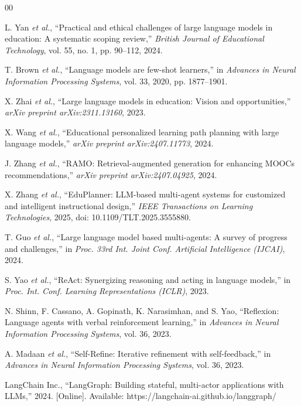 \begin{thebibliography}{00}

 L. Yan \emph{et al.}, ``Practical and ethical challenges of large language models in education: A systematic scoping review,'' \emph{British Journal of Educational Technology}, vol. 55, no. 1, pp. 90--112, 2024.

 T. Brown \emph{et al.}, ``Language models are few-shot learners,'' in \emph{Advances in Neural Information Processing Systems}, vol. 33, 2020, pp. 1877--1901.

 X. Zhai \emph{et al.}, ``Large language models in education: Vision and opportunities,'' \emph{arXiv preprint arXiv:2311.13160}, 2023.

 X. Wang \emph{et al.}, ``Educational personalized learning path planning with large language models,'' \emph{arXiv preprint arXiv:2407.11773}, 2024.

 J. Zhang \emph{et al.}, ``RAMO: Retrieval-augmented generation for enhancing MOOCs recommendations,'' \emph{arXiv preprint arXiv:2407.04925}, 2024.

 X. Zhang \emph{et al.}, ``EduPlanner: LLM-based multi-agent systems for customized and intelligent instructional design,'' \emph{IEEE Transactions on Learning Technologies}, 2025, doi: 10.1109/TLT.2025.3555880.

 T. Guo \emph{et al.}, ``Large language model based multi-agents: A survey of progress and challenges,'' in \emph{Proc. 33rd Int. Joint Conf. Artificial Intelligence (IJCAI)}, 2024.

 S. Yao \emph{et al.}, ``ReAct: Synergizing reasoning and acting in language models,'' in \emph{Proc. Int. Conf. Learning Representations (ICLR)}, 2023.

 N. Shinn, F. Cassano, A. Gopinath, K. Narasimhan, and S. Yao, ``Reflexion: Language agents with verbal reinforcement learning,'' in \emph{Advances in Neural Information Processing Systems}, vol. 36, 2023.

 A. Madaan \emph{et al.}, ``Self-Refine: Iterative refinement with self-feedback,'' in \emph{Advances in Neural Information Processing Systems}, vol. 36, 2023.

 LangChain Inc., ``LangGraph: Building stateful, multi-actor applications with LLMs,'' 2024. [Online]. Available: https://langchain-ai.github.io/langgraph/


\end{thebibliography}
